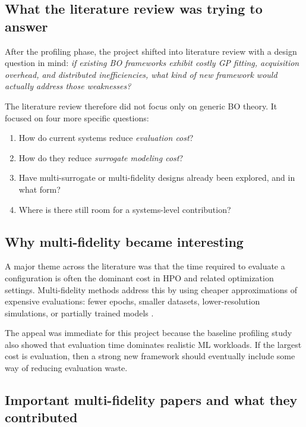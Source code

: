 \documentclass[11pt]{article}
\begin{document}
\subsection{What the literature review was trying to answer}

After the profiling phase, the project shifted into literature review with a design question in mind: \emph{if existing BO frameworks exhibit costly GP fitting, acquisition overhead, and distributed inefficiencies, what kind of new framework would actually address those weaknesses?}

The literature review therefore did not focus only on generic BO theory. It focused on four more specific questions:
\begin{enumerate}[leftmargin=1.5em]
    \item How do current systems reduce \emph{evaluation cost}?
    \item How do they reduce \emph{surrogate modeling cost}?
    \item Have multi-surrogate or multi-fidelity designs already been explored, and in what form?
    \item Where is there still room for a systems-level contribution?
\end{enumerate}

\subsection{Why multi-fidelity became interesting}

A major theme across the literature was that the time required to evaluate a configuration is often the dominant cost in HPO and related optimization settings. Multi-fidelity methods address this by using cheaper approximations of expensive evaluations: fewer epochs, smaller datasets, lower-resolution simulations, or partially trained models \cite{won2025review, do2024review, wu2020takg}.

The appeal was immediate for this project because the baseline profiling study also showed that evaluation time dominates realistic ML workloads. If the largest cost is evaluation, then a strong new framework should eventually include some way of reducing evaluation waste.

\subsection{Important multi-fidelity papers and what they contributed}
\end{document}
